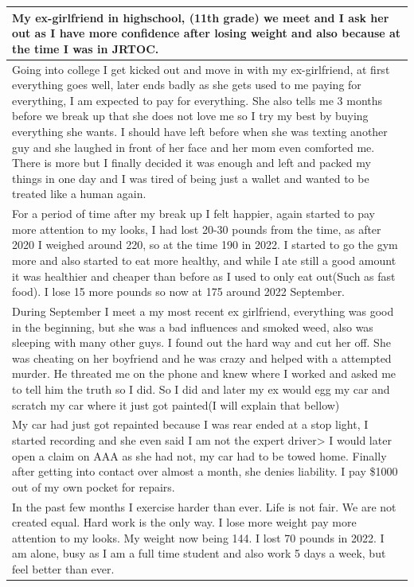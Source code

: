 \documentclass[
  .7em,
  letterpaper,
  DIV=11,
  numbers=noendperiod]{scrartcl}
\begin{document}
\begin{table}
\begin{tabular}{l}
\hline
My ex-girlfriend in highschool, (11th grade) we meet and I ask her out as I have more confidence after losing weight and also because at the time I was in JRTOC.\\
\hline
Going into college I get kicked out and move in with my ex-girlfriend, at first everything goes well, later ends badly as she gets used to me paying for everything, I am expected to pay for everything. She also tells me 3 months before we break up that she does not love me so I try my best by buying everything she wants. I should have left before when she was texting another guy and she laughed in front of her face and her mom even comforted me. There is more but I finally decided it was enough and left and packed my things in one day and I was tired of being just a wallet and wanted to be treated like a human again.\\
\hline
For a period of time after my break up I felt happier, again started to pay more attention to my looks, I had lost 20-30 pounds from the time, as after 2020 I weighed around 220, so at the time 190 in 2022. I started to go the gym more and also started to eat more healthy, and while I ate still a good amount it was healthier and cheaper than before as I used to only eat out(Such as fast food). I lose 15 more pounds so now at 175 around 2022 September.\\
\hline
During September I meet a my most recent ex girlfriend, everything was good in the beginning, but she was a bad influences and smoked weed, also was sleeping with many other guys. I found out the hard way and cut her off. She was cheating on her boyfriend and he was crazy and helped with a attempted murder. He threated me on the phone and knew where I worked and asked me to tell him the truth so I did. So I did and later my ex would egg my car and scratch my car where it just got painted(I will explain that bellow)\\
\hline
My car had just got repainted because I was rear ended at a stop light, I started recording and she even said I am not the expert driver> I would later open a claim on AAA as she had not, my car had to be towed home. Finally after getting into contact over almost a month, she denies liability. I pay \$1000 out of my own pocket for repairs.\\
\hline
In the past few months I exercise harder than ever. Life is not fair. We are not created equal. Hard work is the only way. I lose more weight pay more attention to my looks. My weight now being 144. I lost 70 pounds in 2022. I am alone, busy as I am a full time student and also work 5 days a week, but feel better than ever.\\

\end{tabular}
\end{table}
\end{document}
